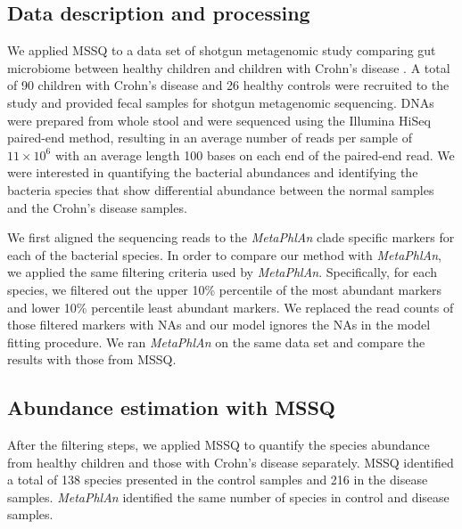 \subsection{Data description and processing} 
We applied MSSQ to a data set of shotgun metagenomic study comparing gut microbiome between healthy children and children with Crohn's disease \citep{lewis2015inflammation,lee2015comparative}. A total of 90 children with  Crohn's disease  and 26 healthy controls were recruited to the study and  provided fecal samples for  shotgun metagenomic sequencing.  DNAs were prepared from whole stool and were sequenced using the Illumina HiSeq paired-end method, resulting in an average number of reads per sample of $11 \times 10^6$ with an average length 100 bases on each end of the paired-end read. We were  interested in quantifying the bacterial abundances and identifying the  bacteria species that show differential abundance between the normal samples and the Crohn's disease samples.


We first aligned the sequencing reads  to the {\it MetaPhlAn} clade specific markers for each of the bacterial species.  In order to compare our method with {\it MetaPhlAn}, we applied the same filtering criteria used by {\it MetaPhlAn}. Specifically,  for each species, we filtered out the upper 10\% percentile of the most abundant markers and lower 10\% percentile least abundant markers. We replaced the read counts of those filtered markers with NAs and our model ignores the NAs in the model fitting procedure. We ran  {\it MetaPhlAn} on the same data set and compare the results with those from MSSQ.


\subsection{Abundance estimation with MSSQ}
After the filtering steps, we applied MSSQ to  quantify the  species abundance from healthy children and those with Crohn's disease separately. MSSQ identified a total of 138 species presented in the control samples and 216 in the disease samples.  {\it MetaPhlAn} identified the same number of species in control and disease samples. 


